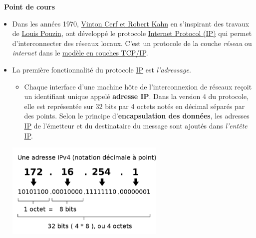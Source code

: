 \documentclass[
  11pt,
]{article}
\providecommand{\tightlist}{%
  \setlength{\itemsep}{0pt}\setlength{\parskip}{0pt}}
\newcounter{cours}
\newenvironment{cours}[1]
{\par \medskip   \addtocounter{cours}{1} \noindent  
\begin{bclogo}[arrondi =0.1,  ombre = true, barre=none, logo=\bcbook, marge=4]{~\textbf{Point de cours} \textbf{\thecours} {\itshape #1} }  \par}
{
\end{bclogo}
 \par \bigskip }
\begin{document}
\begin{cours}{}

\begin{itemize}
\item
  Dans les années 1970,
  \href{https://fr.wikipedia.org/wiki/Vint_Cerf}{Vinton Cerf et Robert
  Kahn} en s'inspirant des travaux de
  \href{https://interstices.info/louis-pouzin-la-tete-dans-les-reseaux/}{Louis
  Pouzin}, ont développé le protocole
  \href{https://fr.wikipedia.org/wiki/Internet_Protocol}{Internet
  Protocol (IP)} qui permet d'interconnecter des réseaux locaux. C'est
  un protocole de la couche \emph{réseau} ou \emph{internet} dans le
  \href{https://fr.wikipedia.org/wiki/Suite_des_protocoles_Internet}{modèle
  en couches TCP/IP}.
\item
  La première fonctionnalité du protocole
  \href{https://fr.wikipedia.org/wiki/Internet_Protocol}{IP} est
  \emph{l'adressage}.

  \begin{itemize}
  \tightlist
  \item
    Chaque interface d'une machine hôte de l'interconnexion de réseaux
    reçoit un identifiant unique appelé \textbf{adresse IP}. Dans la
    version 4 du protocole, elle est représentée sur 32 bits par 4
    octets notés en décimal séparés par des points. Selon le principe
    d'\textbf{encapsulation des données}, les adresses
    \href{https://fr.wikipedia.org/wiki/Internet_Protocol}{IP} de
    l'émetteur et du destinataire du message sont ajoutés dans
    \emph{l'entête}
    \href{https://fr.wikipedia.org/wiki/Internet_Protocol}{IP}.
  \end{itemize}

  \href{https://commons.wikimedia.org/wiki/File:Addresse_Ipv4.svg}{\includegraphics[width=0.6\textwidth,height=\textheight]{images/750px-Addresse_Ipv4_svg.png}}


\end{itemize}
\end{cours}
\end{document}
